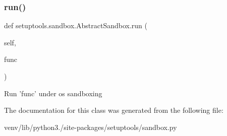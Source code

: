 \subsubsection{\texorpdfstring{run()}{run()}}
{\footnotesize\ttfamily def setuptools.\+sandbox.\+Abstract\+Sandbox.\+run (\begin{DoxyParamCaption}\item[{}]{self,  }\item[{}]{func }\end{DoxyParamCaption})}

\begin{DoxyVerb}Run 'func' under os sandboxing\end{DoxyVerb}
 

The documentation for this class was generated from the following file\+:\begin{DoxyCompactItemize}
\item 
venv/lib/python3./site-\/packages/setuptools/sandbox.\+py\end{DoxyCompactItemize}
